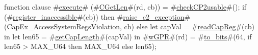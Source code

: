 function clause #\hyperref[zexecute]{execute}# (#\hyperref[zCGetLen]{CGetLen}#(rd, cb)) =
{
  #\hyperref[zcheckCPtwousable]{checkCP2usable}#();
  if (#\hyperref[zregisterzyinaccessible]{register\_inaccessible}#(cb)) then
    #\hyperref[zraisezyctwozyexception]{raise\_c2\_exception}#(CapEx_AccessSystemRegsViolation, cb)
  else
    let capVal = #\hyperref[zreadCapReg]{readCapReg}#(cb) in
    let len65  = #\hyperref[zgetCapLength]{getCapLength}#(capVal) in
    #\hyperref[zwGPR]{wGPR}#(rd) = #\hyperref[ztozybits]{to\_bits}#(64, if len65 > MAX_U64 then MAX_U64 else len65);
}
